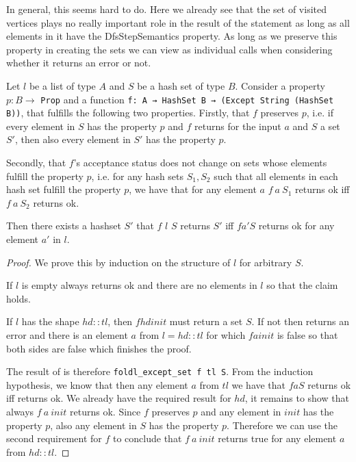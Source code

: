 In general, this seems hard to do.
Here we already see that the set of visited vertices plays no really important role in the result of the statement as long as all elements in it have the DfsStepSemantics property. As long as we preserve this property in creating the sets we can view \foldlexceptset as individual calls when considering whether it returns an error or not.

\begin{lemma}[\foldlexceptsetisok]\label{lem:foldlexceptsetisok}
  Let $l$ be a list of type $A$ and $S$ be a hash set of type $B$. Consider a property $p: B \to$ \lstinline|Prop| and a function \lstinline|f: A → HashSet B → (Except String (HashSet B))|, that fulfills the following two properties.
  Firstly, that $f$ preserves $p$, i.e. if every element in $S$ has the property $p$ and $f$ returns for the input $a$ and $S$ a set $S'$, then also every element in $S'$ has the property $p$.

  Secondly, that $f$'s acceptance status does not change on sets whose elements fulfill the property $p$, i.e. for any hash sets $S_1, S_2$ such that all elements in each hash set fulfill the property $p$, we have that for any element $a$ $f\ a\ S_1$ returns ok iff $f\ a\ S_2$ returns ok.
  
  Then there exists a hashset $S'$ that \foldlexceptset $f$ $l$ $S$ returns $S'$ iff $f a' S$ returns ok for any element $a'$ in $l$.
\end{lemma}
\begin{proof}
  We prove this by induction on the structure of $l$ for arbitrary $S$.

  If $l$ is empty \foldlexceptset always returns ok and there are no elements in $l$ so that the claim holds.

  If $l$ has the shape $hd::tl$, then $f hd init$ must return a set $S$. If not then \foldlexceptset returns an error and there is an element $a$ from $l=hd::tl$ for which $f a init$ is false so that both sides are false which finishes the proof.

  The result of \foldlexceptset is therefore \lstinline|foldl_except_set f tl S|. From the induction hypothesis, we know that then any element $a$ from $tl$ we have that $f a S$ returns ok iff \foldlexceptset returns ok. We already have the required result for $hd$, it remains to show that always $f\ a\ init$ returns ok. Since $f$ preserves $p$ and any element in $init$ has the property $p$, also any element in $S$ has the property $p$. Therefore we can use the second requirement for $f$ to conclude that  $f\ a\ init$ returns true for any element $a$ from $hd::tl$.
\end{proof}

